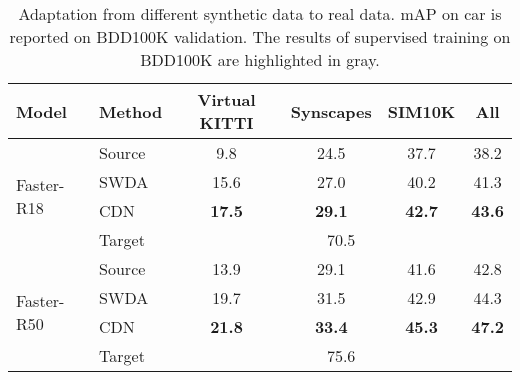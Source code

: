 \documentclass[runningheads]{llncs}
\begin{document}
\vspace{-20pt}


\begin{table}[]
\centering
\begin{tabular}{l|l|c|c|c|c}
\hline
Model                       &  Method               & Virtual KITTI      &  Synscapes      &  SIM10K    & All  \\ \hline
\multirow{4}{*}{Faster-R18} & Source                &    9.8             &  24.5           &  37.7      &  38.2 \\
                      & SWDA\cite{Saito_2019_CVPR}  & 15.6               & 27.0            &  40.2      &   41.3    \\
                            & CDN                   &  \bf  17.5         & \bf  29.1    & \bf  42.7     &  \bf  43.6   \\
                            & Target          & \multicolumn{4}{c}{\cellcolor{gray!10} 70.5}   \\  \hline
\multirow{4}{*}{Faster-R50}  & Source             &   13.9              & 29.1             & 41.6       &  42.8 \\
                & SWDA\cite{Saito_2019_CVPR}     &   19.7               & 31.5             & 42.9       &  44.3    \\
                             & CDN              & \bf 21.8              & \bf 33.4    & \bf 45.3        & \bf 47.2    \\
                            & Target               &  \multicolumn{4}{c}{\cellcolor{gray!10}75.6}   \\   \hline

\end{tabular}
\caption{Adaptation from different synthetic data to real data.
mAP on car is reported on BDD100K validation.
The results of supervised training on BDD100K are highlighted in gray.
}
\label{tb: syn2real}
\end{table}
\end{document}
